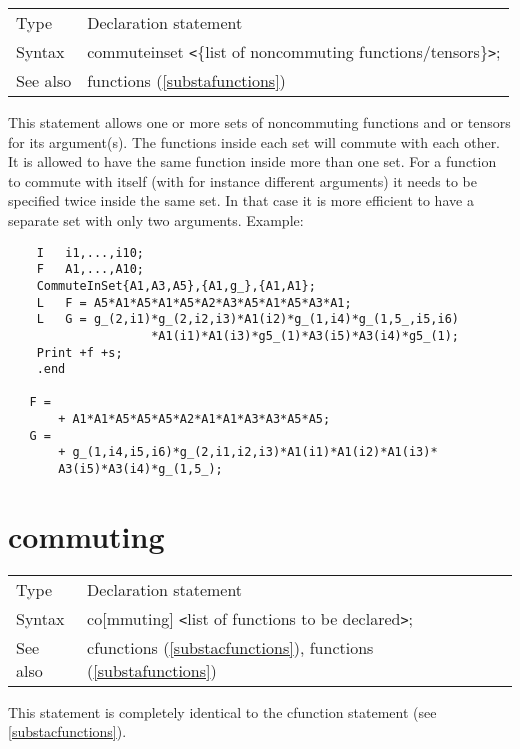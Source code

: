 \noindent \begin{tabular}{ll}
Type & Declaration statement\\
Syntax & commuteinset {\tt<}$\{$list of noncommuting functions/tensors$\}${\tt>}; \\
See also & functions (\ref{substafunctions})
\end{tabular} \vspace{4mm}

\noindent This statement allows one or more sets of 
noncommuting functions and or tensors for its argument(s). The functions 
inside each set will commute with each other. It is allowed to have the 
same function inside more than one set. For a function to commute with 
itself (with for instance different arguments) it needs to be specified 
twice inside the same set. In that case it is more efficient to have a 
separate set with only two arguments. Example:
\begin{verbatim}
    I   i1,...,i10;
    F   A1,...,A10;
    CommuteInSet{A1,A3,A5},{A1,g_},{A1,A1};
    L   F = A5*A1*A5*A1*A5*A2*A3*A5*A1*A5*A3*A1;
    L   G = g_(2,i1)*g_(2,i2,i3)*A1(i2)*g_(1,i4)*g_(1,5_,i5,i6)
                    *A1(i1)*A1(i3)*g5_(1)*A3(i5)*A3(i4)*g5_(1);
    Print +f +s;
    .end

   F =
       + A1*A1*A5*A5*A5*A2*A1*A1*A3*A3*A5*A5;
   G =
       + g_(1,i4,i5,i6)*g_(2,i1,i2,i3)*A1(i1)*A1(i2)*A1(i3)*
       A3(i5)*A3(i4)*g_(1,5_);
\end{verbatim}
\vspace{10mm}

 
\section{commuting}
\label{substacommuting}

\noindent \begin{tabular}{ll}
Type & Declaration statement\\
Syntax & co[mmuting] {\tt<}list of functions to be declared{\tt>}; \\
See also & cfunctions (\ref{substacfunctions}), functions (\ref{substafunctions})
\end{tabular} \vspace{4mm}

\noindent This statement is completely identical to the 
cfunction statement (see \ref{substacfunctions}). \vspace{10mm}

